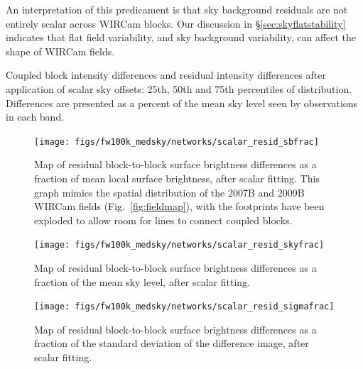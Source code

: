 \documentclass[iop]{emulateapj}
\newcommand{\Fig}[1]{Fig.~\ref{fig:#1}}  %
\newcommand{\Sec}[1]{\S\ref{sec:#1}}  %
\begin{document}
An interpretation of this predicament is that sky background residuals are not entirely scalar across WIRCam blocks.
Our discussion in \Sec{skyflatstability} indicates that flat field variability, and sky background variability, can affect the shape of WIRCam fields.

\begin{table}[t]
\centering
\caption[Coupled block differences and residual differences after
scalar sky offsets]{Coupled block intensity differences and residual intensity differences after application of scalar sky offsets: 25th, 50th and 75th percentiles of distribution.
Differences are presented as a percent of the mean sky level seen by observations in each band.
}

\label{tab:fw100k_medsky_scalar_resid_diffs}
\end{table}

\begin{figure}[t]
\centering
\texttt{[image: figs/fw100k\_medsky/networks/scalar\_resid\_sbfrac]}
\caption{Map of residual block-to-block surface brightness differences as a fraction of mean local surface brightness, after scalar fitting.
  This graph mimics the spatial distribution of the 2007B and 2009B WIRCam fields (\Fig{fieldmap}), with the footprints have been exploded to allow room for lines to connect coupled blocks.
}
\label{fig:fw100k_medsky_scalar_resid_sbfrac}
\end{figure}

\begin{figure}[t]
\centering
\texttt{[image: figs/fw100k\_medsky/networks/scalar\_resid\_skyfrac]}
\caption{Map of residual block-to-block surface brightness differences as a fraction of the mean sky level, after scalar fitting.}
\label{fig:fw100k_medsky_scalar_resid_skyfrac}
\end{figure}

\begin{figure}[t]
\centering
\texttt{[image: figs/fw100k\_medsky/networks/scalar\_resid\_sigmafrac]}
\caption{Map of residual block-to-block surface brightness differences as a fraction of the standard deviation of the difference image, after scalar fitting.}
\label{fig:fw100k_medsky_scalar_resid_sigmafrac}
\end{figure}
\end{document}
